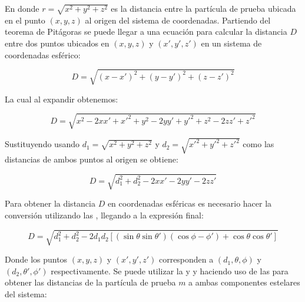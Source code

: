 En donde $r = \sqrt{x^2 + y^2 + z^2}$ es la distancia entre la partícula de
prueba ubicada en el punto $(x, y, z)$ al origen del sistema de coordenadas.
Partiendo del teorema de Pitágoras se puede llegar a una ecuación para calcular
la distancia $D$ entre dos puntos ubicados en $(x, y, z)$ y $(x', y', z')$ en un
sistema de coordenadas esférico:

\begin{eqfloat}[!ht]
	\centering
	\begin{equation}
		D = \sqrt{(x - x')^2 + (y - y')^2 + (z - z')^2}
	\end{equation}
\end{eqfloat}

La cual al expandir obtenemos:

\begin{eqfloat}[!ht]
	\centering
	\begin{equation}
		D = \sqrt{x^2 - 2xx' + x'^2 + y^2 - 2yy' + y'^2 + z^2 - 2zz' + z'^2}
	\end{equation}
\end{eqfloat}

Sustituyendo usando $d_1 = \sqrt{x^2 + y^2 + z^2}$ y $d_2 = \sqrt{x'^2 + y'^2 +
z'^2}$ como las distancias de ambos puntos al origen se obtiene:

\begin{eqfloat}[!ht]
	\centering
	\begin{equation}
		D = \sqrt{d_1^2 + d_2^2 - 2xx' - 2yy' -2zz'}
	\end{equation}
	\blankcaption
	\label{ecuacionDistanciaCartesiana}
\end{eqfloat}

Para obtener la distancia $D$ en coordenadas esféricas es necesario hacer la
conversión utilizando las , llegando a la expresión final:

\begin{eqfloat}[!ht]
	\centering
	\begin{equation}
		D = \sqrt{d_1^2 + d_2^2 - 2d_1d_2[(\sin{\theta} \sin{\theta'})(\cos{\phi - \phi'}) + \cos{\theta} \cos{\theta'}]}
	\end{equation}
	\blankcaption
	\label{ecuacionDistanciasEsferica}
\end{eqfloat}

Donde los puntos $(x, y, z)$ y $(x', y', z')$ corresponden a $(d_1, \theta,
\phi)$ y $(d_2, \theta', \phi')$ respectivamente. Se puede utilizar la
 y
\textemdash y haciendo uso de las
\textemdash para obtener las
distancias de la partícula de prueba $m$ a ambas componentes estelares del
sistema:

